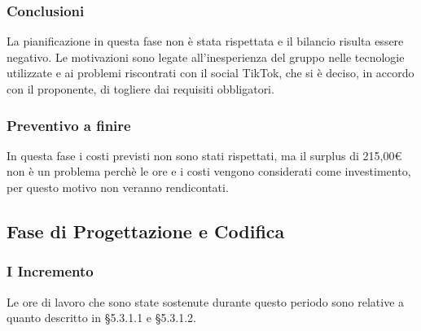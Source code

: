 \subsubsection{Conclusioni}
La pianificazione in questa fase non è stata rispettata e il bilancio risulta essere negativo. Le motivazioni sono legate all'inesperienza del gruppo nelle tecnologie utilizzate e ai problemi riscontrati con il social TikTok, che si è deciso, in accordo con il proponente, di togliere dai requisiti obbligatori.

\subsubsection{Preventivo a finire}
In questa fase i costi previsti non sono stati rispettati, ma il surplus di 215,00\euro \xspace non è un problema perchè le ore e i costi vengono considerati come investimento, per questo motivo non veranno rendicontati.

\pagebreak

\subsection{Fase di Progettazione e Codifica}
\subsubsection{I Incremento}
Le ore di lavoro che sono state sostenute durante questo periodo sono relative a quanto descritto in §5.3.1.1 e §5.3.1.2.

